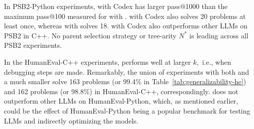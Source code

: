 In PSB2-Python experiments, \method{} with Codex has larger pass@1000 than the maximum pass@100 measured for \method{} with \gpt{}. \method{} with Codex also solves 20 problems at least once, whereas \method{} with \gpt{} solves 18.
\method{} with Codex also outperforms other LLMs on PSB2 in C++.
No parent selection strategy or tree-arity $N^*$ is leading across all PSB2 experiments. 

In the HumanEval-C++ experiments, \method{} performs well at larger $k,$ i.e., when debugging steps are made. 
Remarkably, the union of \method{} experiments with both \gpt{} and a much smaller \llama{} solve 163 problems (or 99.4\% in Table~\ref{tab:generalizability-he}) and 162 problems (or 98.8\%) in HumanEval-C++, correspondingly.
\method{} does not outperform other LLMs on HumanEval-Python, which, as mentioned earlier, could be the effect of HumanEval-Python being a popular benchmark for testing LLMs and indirectly optimizing the models.

